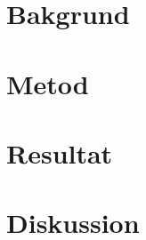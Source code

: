 \documentclass[11pt, titlepage, oneside, a4paper]{article}
\begin{document}
	\section{Bakgrund}
	

	\newpage

	\section{Metod}
	

	\newpage

	\section{Resultat}
	

	\newpage

	\section{Diskussion}
	
	
	
% 		
% 
\pagebreak
%
\nocite{*}  %

%
%
% 
%

\end{document}
